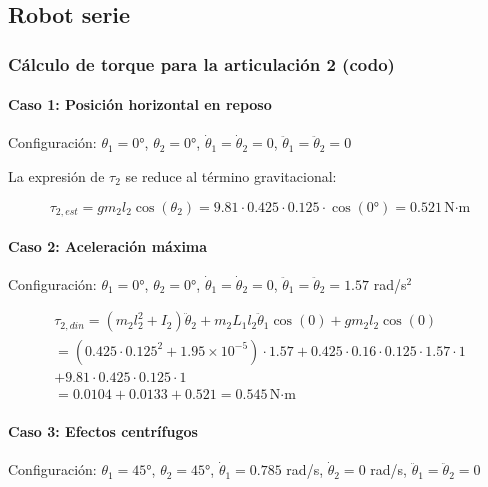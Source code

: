 
\subsection{Robot serie}
\subsubsection{Cálculo de torque para la articulación 2 (codo)}

\paragraph{Caso 1: Posición horizontal en reposo}

Configuración: $\theta_1 = 0°$, $\theta_2 = 0°$, $\dot{\theta}_1 = \dot{\theta}_2 = 0$, $\ddot{\theta}_1 = \ddot{\theta}_2 = 0$

La expresión de $\tau_2$ se reduce al término gravitacional:

\begin{equation}
\tau_{2,est} = gm_2l_2\cos(\theta_2) = 9.81 \cdot 0.425 \cdot 0.125 \cdot \cos(0°) = 0.521 \, \text{N·m}
\end{equation}

\paragraph{Caso 2: Aceleración máxima}

Configuración: $\theta_1 = 0°$, $\theta_2 = 0°$, $\dot{\theta}_1 = \dot{\theta}_2 = 0$, $\ddot{\theta}_1 = \ddot{\theta}_2 = 1.57$ rad/s$^2$

\begin{multline}
\tau_{2,din} = (m_2l_2^2 + I_2)\ddot{\theta}_2 + m_2L_1l_2\ddot{\theta}_1\cos(0) + gm_2l_2\cos(0) \\
= (0.425 \cdot 0.125^2 + 1.95 \times 10^{-5}) \cdot 1.57 + 0.425 \cdot 0.16 \cdot 0.125 \cdot 1.57 \cdot 1 \\
+ 9.81 \cdot 0.425 \cdot 0.125 \cdot 1 \\
= 0.0104 + 0.0133 + 0.521 = 0.545 \, \text{N·m}
\end{multline}

\paragraph{Caso 3: Efectos centrífugos}

Configuración: $\theta_1 = 45°$, $\theta_2 = 45°$, $\dot{\theta}_1 = 0.785$ rad/s, $\dot{\theta}_2 = 0$ rad/s, $\ddot{\theta}_1 = \ddot{\theta}_2 = 0$

